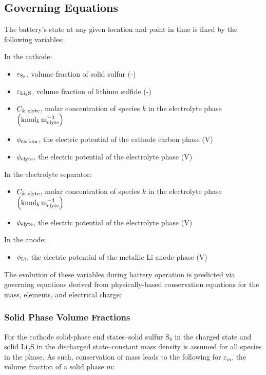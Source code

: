 \documentclass{elsarticle}
\begin{document}
\subsection{Governing Equations}
The battery’s state at any given location and point in time is fixed by the following variables:

In the cathode:
\begin{itemize}
    \item $\varepsilon_{\rm S_8}$, volume fraction of solid sulfur (-)
	\item $\varepsilon_{\rm Li_2S}$, volume fraction of lithium sulfide (-)
	\item $C_{k,\,{\rm elyte}}$, molar concentration of species $k$ in the electrolyte phase $\left({\rm kmol}_k\, {\rm m_{elyte}^{-3}}\right)$
	\item $\phi_{\rm carbon}$, the electric potential of the cathode carbon phase (V)
	\item $\phi_{\rm elyte}$, the electric potential of the electrolyte phase (V)
\end{itemize}

In the electrolyte separator:
\begin{itemize}
    \item $C_{k,\,{\rm elyte}}$, molar concentration of species $k$ in the electrolyte phase $\left({\rm kmol}_k\, {\rm m_{elyte}^{-3}}\right)$
    \item $\phi_{\rm elyte}$, the electric potential of the electrolyte phase (V)
\end{itemize}

In the anode:
\begin{itemize}
    \item $\phi_{\rm Li}$, the electric potential of the metallic Li anode phase (V)
\end{itemize}

The evolution of these variables during battery operation is predicted via governing equations derived from physically-based conservation equations for the mass, elements, and electrical charge:

\subsubsection{Solid Phase Volume Fractions}
For the cathode solid-phase end states--solid sulfur S$_8$ in the charged state and solid Li$_2$S in the discharged state--constant mass density is assumed for all species in the phase. As such, conservation of mass leads to the following for $\varepsilon_m$, the volume fraction of a solid phase $m$: 
\end{document}
